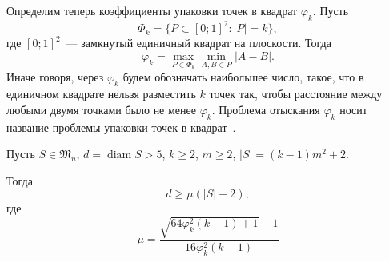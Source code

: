 Определим теперь коэффициенты упаковки точек в квадрат $\varphi_k$.
Пусть
\begin{equation*}
	\Phi_k = \{ P \subset [0;1]^2 : |P|=k\}
	,
\end{equation*}
где $[0;1]^2$~--- замкнутый единичный квадрат на плоскости.
Тогда
\begin{equation*}
	\varphi_k = \max_{P \in \Phi_k} \min_{A,B \in P} |A - B|
	.
\end{equation*}
Иначе говоря, через $\varphi_k$ будем обозначать наибольшее число, такое,
что в единичном квадрате нельзя разместить $k$ точек так,
чтобы расстояние между любыми двумя точками было не менее $\varphi_k$.
Проблема отыскания $\varphi_k$ носит название проблемы упаковки точек в квадрат~\cite{locatelli2002packing,costa2013valid}.


\begin{lemma}
	Пусть $S\in\mathfrak{M}_n$,
	$d = \operatorname{diam} S > 5$,
	$k \geq 2$,
	$m \geq 2$,
	$ |S| = (k-1)m^2 + 2$.

	Тогда
	\begin{equation}
		d \geq \mu (|S| - 2),
	\end{equation}
	где
	\begin{equation}
		\mu = \frac{\sqrt{64\varphi_k^2 (k-1)+1}-1}{16\varphi_k^2 (k-1)}
	\end{equation}
\end{lemma}

